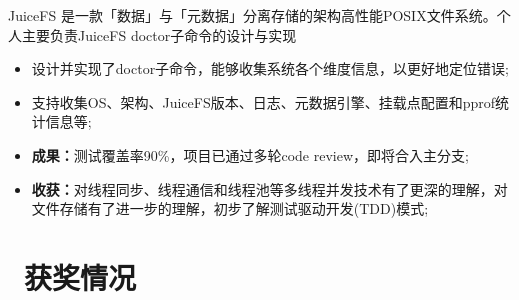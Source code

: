 \documentclass{resume}
\begin{document}
JuiceFS 是一款「数据」与「元数据」分离存储的架构高性能POSIX文件系统。个人主要负责JuiceFS doctor子命令的设计与实现
\begin{onehalfspacing}
  \begin{itemize}
    \item 设计并实现了doctor子命令，能够收集系统各个维度信息，以更好地定位错误;
    \item 支持收集OS、架构、JuiceFS版本、日志、元数据引擎、挂载点配置和pprof统计信息等;
    \item \textbf{成果：}测试覆盖率90\%，项目已通过多轮code review，即将合入主分支;
    \item \textbf{收获：}对线程同步、线程通信和线程池等多线程并发技术有了更深的理解，对文件存储有了进一步的理解，初步了解测试驱动开发(TDD)模式;
  \end{itemize}
\end{onehalfspacing}


\section{\faHeartO\ 获奖情况}



\end{document}
